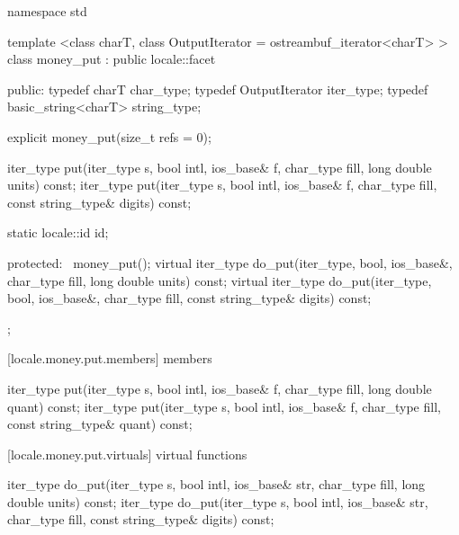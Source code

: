 %
\begin{codeblock}
namespace std {
  template <class charT,
    class OutputIterator = ostreambuf_iterator<charT> >
  class money_put : public locale::facet {
  public:
    typedef charT               char_type;
    typedef OutputIterator      iter_type;
    typedef basic_string<charT> string_type;

    explicit money_put(size_t refs = 0);

    iter_type put(iter_type s, bool intl, ios_base& f,
                  char_type fill, long double units) const;
    iter_type put(iter_type s, bool intl, ios_base& f,
                  char_type fill, const string_type& digits) const;

    static locale::id id;

  protected:
    ~money_put();
    virtual iter_type do_put(iter_type, bool, ios_base&, char_type fill,
                             long double units) const;
    virtual iter_type do_put(iter_type, bool, ios_base&, char_type fill,
                             const string_type& digits) const;
  };
}
\end{codeblock}

[locale.money.put.members]{ members}

%
%
\begin{itemdecl}
iter_type put(iter_type s, bool intl, ios_base& f, char_type fill,
              long double quant) const;
iter_type put(iter_type s, bool intl, ios_base& f, char_type fill,
              const string_type& quant) const;
\end{itemdecl}

\begin{itemdescr}
\pnum
\returns
{}
\end{itemdescr}

[locale.money.put.virtuals]{ virtual functions}

%
%
\begin{itemdecl}
iter_type do_put(iter_type s, bool intl, ios_base& str,
                 char_type fill, long double units) const;
iter_type do_put(iter_type s, bool intl, ios_base& str,
                 char_type fill, const string_type& digits) const;
\end{itemdecl}

